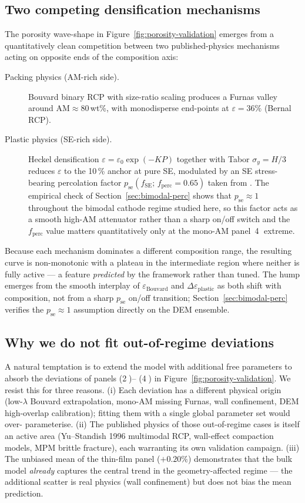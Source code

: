 \documentclass[11pt, a4paper]{article}
\begin{document}
\subsection{Two competing densification mechanisms}
The porosity wave-shape in
Figure~\ref{fig:porosity-validation} emerges from a quantitatively
clean competition between two published-physics mechanisms acting
on opposite ends of the composition axis:
\begin{description}
\item[Packing physics (AM-rich side).] Bouvard binary RCP with
  size-ratio scaling produces a Furnas valley around
  $\text{AM} \approx 80$\,wt\%, with monodisperse end-points at
  $\varepsilon = 36\%$ (Bernal RCP).
\item[Plastic physics (SE-rich side).] Heckel densification
  $\varepsilon = \varepsilon_0 \exp(-K P)$ together with Tabor
  $\sigma_y = H/3$ \citep{Tabor1948} reduces $\varepsilon$ to the
  10\,\% anchor at pure SE, modulated by an SE stress-bearing
  percolation factor $p_{\mathrm{se}}(f_{\mathrm{SE}};\,
  f_{\mathrm{perc}} = 0.65)$ taken from \citet{LiuYin2025}.  The
  empirical check of Section~\ref{sec:bimodal-perc} shows that
  $p_{\mathrm{se}} \approx 1$ throughout the bimodal cathode
  regime studied here, so this factor acts as a smooth high-AM
  attenuator rather than a sharp on/off switch and the
  $f_{\mathrm{perc}}$ value matters quantitatively only at the
  mono-AM panel~\textcircled{4} extreme.
\end{description}
Because each mechanism dominates a different composition range,
the resulting curve is non-monotonic with a plateau in the
intermediate region where neither is fully active --- a feature
\emph{predicted} by the framework rather than tuned.  The hump
emerges from the smooth interplay of $\varepsilon_{\mathrm{Bouvard}}$
and $\Delta\varepsilon_{\mathrm{plastic}}$ as both shift with
composition, not from a sharp $p_{\mathrm{se}}$ on/off transition;
Section~\ref{sec:bimodal-perc} verifies the
$p_{\mathrm{se}} \approx 1$ assumption directly on the DEM
ensemble.

\subsection{Why we do not fit out-of-regime deviations}
A natural temptation is to extend the model with additional free
parameters to absorb the deviations of panels (\textcircled{2})--%
(\textcircled{4}) in Figure~\ref{fig:porosity-validation}. We resist
this for three reasons. (i) Each deviation has a different
physical origin (low-$\lambda$ Bouvard extrapolation, mono-AM
missing Furnas, wall confinement, DEM high-overlap calibration);
fitting them with a single global parameter set would over-
parameterise. (ii) The published physics of those out-of-regime
cases is itself an active area (Yu--Standish 1996 multimodal RCP,
wall-effect compaction models, MPM brittle fracture), each
warranting its own validation campaign. (iii) The unbiased mean of
the thin-film panel ($+0.20\%$) demonstrates that the bulk model
\emph{already} captures the central trend in the
geometry-affected regime --- the additional scatter is real
physics (wall confinement) but does not bias the mean prediction.
\end{document}
